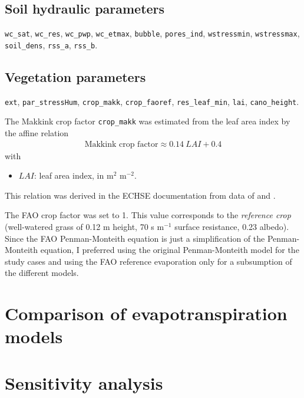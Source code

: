\documentclass{scrreprt}
\begin{document}
\section{Soil hydraulic parameters} \label{sec:parest_soil}

\verb!wc_sat!, \verb!wc_res!, \verb!wc_pwp!, \verb!wc_etmax!, \verb!bubble!, \verb!pores_ind!, \verb!wstressmin!, \verb!wstressmax!, \verb!soil_dens!, \verb!rss_a!, \verb!rss_b!.

\section{Vegetation parameters} \label{sec:parest_veg}

\verb!ext!, \verb!par_stressHum!, \verb!crop_makk!, \verb!crop_faoref!, \verb!res_leaf_min!, \verb!lai!, \verb!cano_height!.

The Makkink crop factor \verb!crop_makk! was estimated from the leaf area index by the affine relation
\begin{align} \label{eq:cropmakk}
  \text{Makkink~crop~factor} \approx 0.14 ~ LAI + 0.4
\end{align}
%
with
\begin{itemize}
  \item[] $LAI$: leaf area index, in m$^2$ m$^{-2}$.
\end{itemize}
%
This relation was derived in the ECHSE documentation from data of \citet{feddes87} and \citet{ludwig06}.

The FAO crop factor was set to 1.
This value corresponds to the \emph{reference crop} (well-watered grass of 0.12 m height, 70 s m$^{-1}$ surface resistance, 0.23 albedo).
Since the FAO Penman-Monteith equation is just a simplification of the Penman-Monteith equation, I preferred using the original Penman-Monteith model for the study cases and using the FAO reference evaporation only for a subsumption of the different models.


\chapter{Comparison of evapotranspiration models} \label{ch:modelcomp}


\chapter{Sensitivity analysis} \label{ch:sensana}
\end{document}
